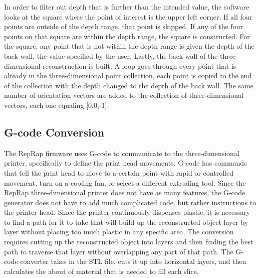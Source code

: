 \documentclass[pdftex,10.5pt]{report}
\begin{document}
In order to filter out depth that is further than the intended value, the software looks at the square where the point of interest is the upper left corner.  If all four points are outside of the depth range, that point is skipped. If any of the four points on that square are within the depth range, the square is constructed. For the square, any point that is not within the depth range is given the depth of the back wall, the value specified by the user. Lastly, the back wall of the three-dimensional reconstruction is built. A loop goes through every point that is already in the three-dimensional point collection, each point is copied to the end of the collection with the depth changed to the depth of the back wall. The same number of orientation vectors are added to the collection of three-dimensional vectors, each one equaling [0,0,-1]. 
\cite{cite8}

\subsection{G-code Conversion}
The RepRap firmware uses G-code to communicate to the three-dimensional printer, specifically to define the print head movements. G-code has commands that tell the print head to move to a certain point with rapid or controlled movement, turn on a cooling fan, or select a different extruding tool. Since the RepRap three-dimensional printer does not have as many features, the G-code generator does not have to add much complicated code, but rather instructions to the printer head. Since the printer continuously dispenses plastic, it is necessary to find a path for it to take that will build up the reconstructed object layer by layer without placing too much plastic in any specific area. The conversion requires cutting up the reconstructed object into layers and then finding the best path to traverse that layer without overlapping any part of that path. The G-code converter takes in the STL file, cuts it up into horizontal layers, and then calculates the about of material that is needed to fill each slice. 

\end{document}
